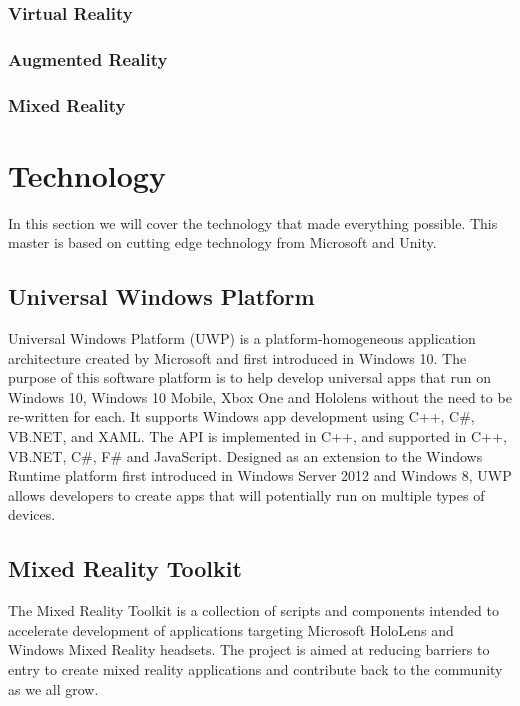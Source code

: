     \subsubsection{Virtual Reality}
    
    \subsubsection{Augmented Reality}
    \subsubsection{Mixed Reality}

\section{Technology}
In this section we will cover the technology that made everything possible. This master is based on cutting edge technology from Microsoft and Unity.

    \subsection{Universal Windows Platform}
    Universal Windows Platform (UWP) is a platform-homogeneous application architecture created by Microsoft and first introduced in Windows 10. The purpose of this software platform is to help develop universal apps that run on Windows 10, Windows 10 Mobile, Xbox One and Hololens without the need to be re-written for each. It supports Windows app development using C++, C\#, VB.NET, and XAML. The API is implemented in C++, and supported in C++, VB.NET, C\#, F\# and JavaScript. Designed as an extension to the Windows Runtime platform first introduced in Windows Server 2012 and Windows 8, UWP allows developers to create apps that will potentially run on multiple types of devices. %
    
    \subsection{Mixed Reality Toolkit}
    The Mixed Reality Toolkit is a collection of scripts and components intended to accelerate development of applications targeting Microsoft HoloLens and Windows Mixed Reality headsets. The project is aimed at reducing barriers to entry to create mixed reality applications and contribute back to the community as we all grow. %

